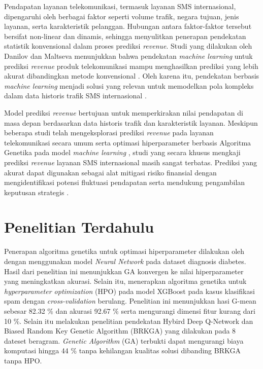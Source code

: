     Pendapatan layanan telekomunikasi, termasuk layanan SMS internasional, dipengaruhi oleh berbagai faktor seperti volume trafik, negara tujuan, jenis layanan, serta karakteristik pelanggan. Hubungan antara faktor-faktor tersebut bersifat non-linear dan dinamis, sehingga 
    menyulitkan penerapan pendekatan statistik konvensional dalam proses prediksi \textit{revenue}. Studi yang dilakukan oleh Danilov dan 
    Maltseva menunjukkan bahwa pendekatan \textit{machine learning} untuk prediksi \textit{revenue} produk telekomunikasi mampu menghasilkan prediksi yang lebih akurat dibandingkan metode konvensional \cite{Danilov2024}. Oleh karena itu, pendekatan berbasis \textit{machine learning} menjadi solusi yang relevan untuk memodelkan pola kompleks dalam data historis trafik SMS internasional \cite{Chen2016}.
    
    Model prediksi \textit{revenue} bertujuan untuk memperkirakan nilai pendapatan di masa depan berdasarkan data historis trafik dan karakteristik layanan. Meskipun beberapa studi telah mengeksplorasi prediksi \textit{revenue} pada layanan telekomunikasi secara umum 
    \cite{Truong2021TelecomRevenue, Danilov2024} serta optimasi 
    hiperparameter berbasis Algoritma Genetika pada model \textit{machine learning} \cite{Ghatasheh2022ModifiedGA}, studi yang secara khusus mengkaji prediksi \textit{revenue} layanan SMS internasional masih sangat terbatas. Prediksi yang akurat dapat digunakan sebagai alat mitigasi risiko finansial dengan mengidentifikasi potensi fluktuasi pendapatan serta mendukung pengambilan keputusan strategis \cite{Oziri2023RevenueForecasting}.

    
    \section{Penelitian Terdahulu}\label{sec:pastresearch}
    Penerapan  algoritma genetika untuk optimasi hiperparameter dilakukan oleh  dengan menggunakan model \textit{Neural Network} pada dataset diagnosis diabetes. Hasil dari penelitian ini menunjukkan GA konvergen ke nilai hiperparameter yang meningkatkan akurasi. Selain itu,  menerapkan algoritma genetika untuk \textit{hyperparameter optimization} (HPO) pada model XGBoost pada kasus klasifikasi spam dengan \textit{cross-validation} berulang. Penelitian ini menunjukkan hasi G-mean sebesar 82.32 \% dan akurasi 92.67 \% serta mengurangi dimensi fitur kurang dari 10 \%. Selain itu  melakukan penelitian pendekatan Hybird Deep Q-Network dan Biased Random Key Genetic Algorithm (BRKGA) yang dilakukan pada 8 dateset beragram. \textit{Genetic Algorithm} (GA) terbukti dapat mengurangi biaya komputasi hingga 44 \% tanpa kehilangan kualitas solusi dibanding BRKGA tanpa HPO.
    
